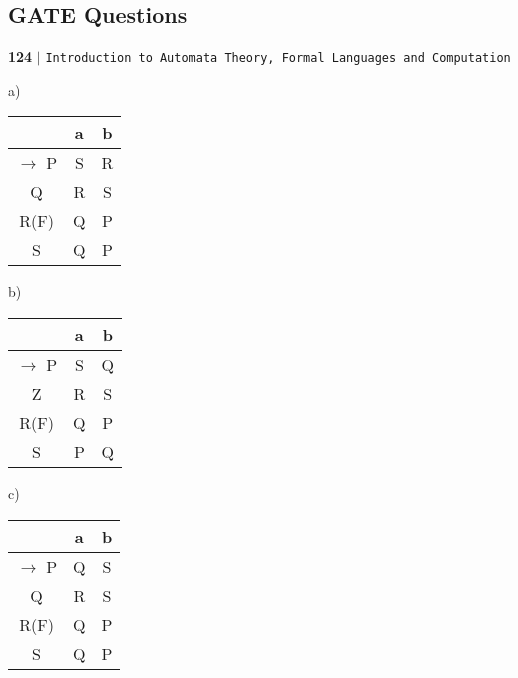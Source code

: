 \documentclass[9pt]{beamer}
\begin{document}
\begin{frame}
\section*{GATE Questions}
 \begin{flushleft}
    \textbf{124}\hspace*{0.1cm} \textbf{$|$} \hspace*{0.1cm} \texttt{Introduction to Automata Theory, Formal Languages and Computation}
  \end{flushleft}
\vspace*{0.4cm}

\begin{multicols}{4}

a)
\begin{center}
\begin{tabular}{|c|c|c|}

\hline
  & a & b \\
\hline
$\rightarrow$ P & S & R \\
\hline
Q & R & S \\
\hline
R(F) & Q & P \\
\hline
S & Q & P \\
\hline

\end{tabular}
\end{center}

b)
\begin{center}
\begin{tabular}{|c|c|c|}

\hline
  & a & b \\
\hline
$\rightarrow$ P & S & Q \\
\hline
Z & R & S \\
\hline
R(F) & Q & P \\
\hline
S & P & Q \\
\hline

\end{tabular}
\end{center}

c)
\begin{center}
\begin{tabular}{|c|c|c|}

\hline
  & a & b \\
\hline
$\rightarrow$ P & Q & S \\
\hline
Q & R & S \\
\hline
R(F) & Q & P \\
\hline
S & Q & P \\
\hline


\end{tabular}
\end{center}
\end{multicols}
\end{frame}
\end{document}
